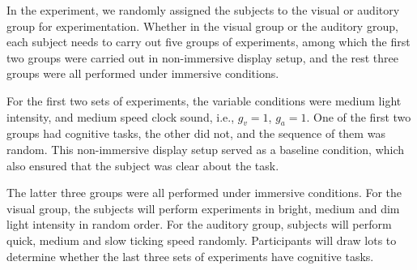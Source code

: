 \documentclass[sigconf]{acmart}
\begin{document}

In the experiment, we randomly assigned the subjects to the visual or auditory group for experimentation. Whether in the visual group or the auditory group, each subject needs to carry out five groups of experiments, among which the first two groups were carried out in non-immersive display setup, and the rest three groups were all performed under immersive conditions. 

For the first two sets of experiments, the variable conditions were medium light intensity, and medium speed clock sound, i.e., $g_v = 1$, $g_a = 1$. One of the first two groups had cognitive tasks, the other did not, and the sequence of them was random. This non-immersive display setup served as a baseline condition, which also ensured that the subject was clear about the task.

The latter three groups were all performed under immersive conditions. For the visual group, the subjects will perform experiments in bright, medium and dim light intensity in random order. For the auditory group, subjects will perform quick, medium and slow ticking speed randomly. Participants will draw lots to determine whether the last three sets of experiments have cognitive tasks.

\end{document}
